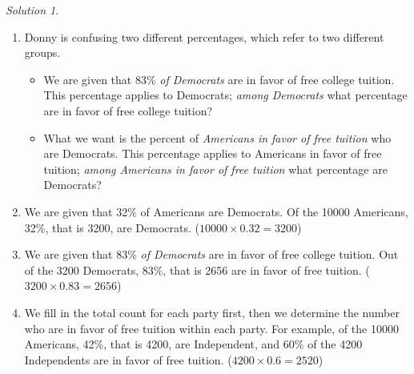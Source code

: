 \documentclass[
  letterpaper,
  DIV=11,
  numbers=noendperiod]{scrreprt}
\providecommand{\tightlist}{%
  \setlength{\itemsep}{0pt}\setlength{\parskip}{0pt}}
\theoremstyle{plain}
\theoremstyle{definition}
\theoremstyle{definition}
\theoremstyle{definition}
\theoremstyle{remark}
\newtheorem{refsolution}{Solution}[chapter]
\begin{document}
\begin{tcolorbox}[enhanced jigsaw, opacityback=0, rightrule=.15mm, coltitle=black, colframe=quarto-callout-tip-color-frame, toprule=.15mm, colbacktitle=quarto-callout-tip-color!10!white, opacitybacktitle=0.6, left=2mm, toptitle=1mm, breakable, title={Solution (click to expand)}, bottomtitle=1mm, colback=white, leftrule=.75mm, titlerule=0mm, arc=.35mm, bottomrule=.15mm]

\begin{refsolution}
\leavevmode

\begin{enumerate}
\def\labelenumi{\arabic{enumi}.}
\item
  Donny is confusing two different percentages, which refer to two
  different groups.

  \begin{itemize}
  \tightlist
  \item
    We are given that 83\% \emph{of Democrats} are in favor of free
    college tuition. This percentage applies to Democrats; \emph{among
    Democrats} what percentage are in favor of free college tuition?
  \item
    What we want is the percent of \emph{Americans in favor of free
    tuition} who are Democrats. This percentage applies to Americans in
    favor of free tuition; \emph{among Americans in favor of free
    tuition} what percentage are Democrats?
  \end{itemize}
\item
  We are given that 32\% of Americans are Democrats. Of the 10000
  Americans, 32\%, that is 3200, are Democrats.
  (\(10000 \times 0.32 = 3200\))
\item
  We are given that 83\% \emph{of Democrats} are in favor of free
  college tuition. Out of the 3200 Democrats, 83\%, that is 2656 are in
  favor of free tuition. (\(3200 \times 0.83 = 2656\))
\item
  We fill in the total count for each party first, then we determine the
  number who are in favor of free tuition within each party. For
  example, of the 10000 Americans, 42\%, that is 4200, are Independent,
  and 60\% of the 4200 Independents are in favor of free tuition.
  (\(4200 \times 0.6 = 2520\))


\end{enumerate}
\end{refsolution}
\end{tcolorbox}
\end{document}
